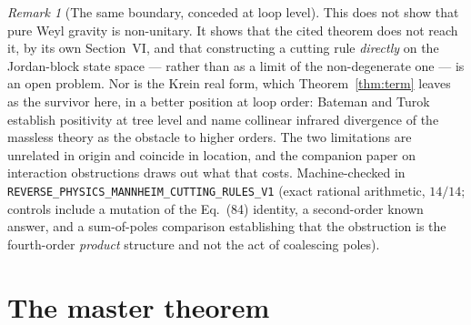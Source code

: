 \documentclass[11pt]{article}
\theoremstyle{definition}
\theoremstyle{remark}
\newtheorem{remark}[theorem]{Remark}
\begin{document}
\begin{remark}[The same boundary, conceded at loop level]
This does not show that pure Weyl gravity is non-unitary.  It shows
that the cited theorem does not reach it, by its own Section~VI, and
that constructing a cutting rule \emph{directly} on the Jordan-block
state space --- rather than as a limit of the non-degenerate one ---
is an open problem.  Nor is the Krein real form, which Theorem~\ref{thm:term}
leaves as the survivor here, in a better position at loop order: Bateman and
Turok~\cite{BT2026} establish positivity at tree level and name collinear
infrared divergence of the massless theory as the obstacle to higher orders.
The two limitations are unrelated in origin and coincide in location, and the
companion paper on interaction obstructions draws out what that costs.
Machine-checked in
\texttt{REVERSE\_PHYSICS\_MANNHEIM\_CUTTING\_RULES\_V1} (exact rational
arithmetic, $14/14$; controls include a mutation of the
Eq.~(84) identity, a second-order known answer, and a sum-of-poles
comparison establishing that the obstruction is the fourth-order
\emph{product} structure and not the act of coalescing poles).
\end{remark}

\section{The master theorem}\label{sec:master}
\end{document}
